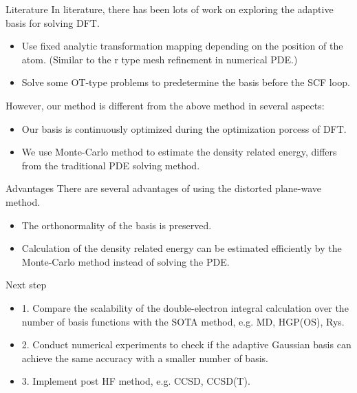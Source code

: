 \documentclass[aspectratio=169]{beamer}
\begin{document}
\begin{frame}{Literature}
	In literature, there has been lots of work on exploring the adaptive basis for
	solving DFT. 
	\begin{itemize}
		\item Use fixed analytic transformation mapping depending on the position of the
		atom. (Similar to the r type mesh refinement in numerical PDE.)
		\item Solve some OT-type problems to predetermine the basis before the SCF
		loop.
	\end{itemize}
	However, our method is different from the above method in several aspects:
	\begin{itemize}
		\item Our basis is continuously optimized during the optimization porcess of
		DFT.
		\item We use Monte-Carlo method to estimate the density related energy,
		differs from the traditional PDE solving method.
	\end{itemize}
\end{frame}

\begin{frame}{Advantages}
	There are several advantages of using the distorted plane-wave method.
	\begin{itemize}
		\item The orthonormality of the basis is preserved.
		\item Calculation of the density related energy can be estimated 
		efficiently by the Monte-Carlo method instead of solving the PDE.
	\end{itemize}
\end{frame}

\begin{frame}{Next step}
	\begin{itemize}
		\item 1. Compare the scalability of the double-electron integral
		calculation over the number of basis functions with the SOTA method, e.g.
		MD, HGP(OS), Rys.
		\item 2. Conduct numerical experiments to check if the adaptive
		Gaussian basis can achieve the same accuracy with a smaller number of
		basis.
		\item 3. Implement post HF method, e.g. CCSD, CCSD(T).
	\end{itemize}
\end{frame}

 
\end{document}
